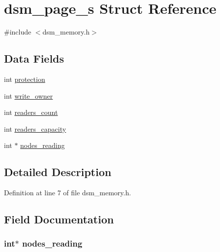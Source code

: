 \hypertarget{structdsm__page__s}{}\section{dsm\+\_\+page\+\_\+s Struct Reference}
\label{structdsm__page__s}


{\ttfamily \#include $<$dsm\+\_\+memory.\+h$>$}

\subsection*{Data Fields}
\begin{DoxyCompactItemize}
\item 
int \hyperlink{structdsm__page__s_ae1d884bf54b7e2e34e84ae0d0ae29b54}{protection}
\item 
int \hyperlink{structdsm__page__s_ae07c60d2fede48e82a22fcfe7e440b15}{write\+\_\+owner}
\item 
int \hyperlink{structdsm__page__s_afd6c40de3c12fd6c40c3b32883e5605f}{readers\+\_\+count}
\item 
int \hyperlink{structdsm__page__s_a9333d37a32125d59fa18a560432c23b9}{readers\+\_\+capacity}
\item 
int $\ast$ \hyperlink{structdsm__page__s_a819a9c5045c082e7a1b9b140977955a2}{nodes\+\_\+reading}
\end{DoxyCompactItemize}


\subsection{Detailed Description}


Definition at line 7 of file dsm\+\_\+memory.\+h.



\subsection{Field Documentation}
\subsubsection[{\texorpdfstring{nodes\+\_\+reading}{nodes_reading}}]{\setlength{\rightskip}{0pt plus 5cm}int$\ast$ nodes\+\_\+reading}\hypertarget{structdsm__page__s_a819a9c5045c082e7a1b9b140977955a2}{}\label{structdsm__page__s_a819a9c5045c082e7a1b9b140977955a2}


